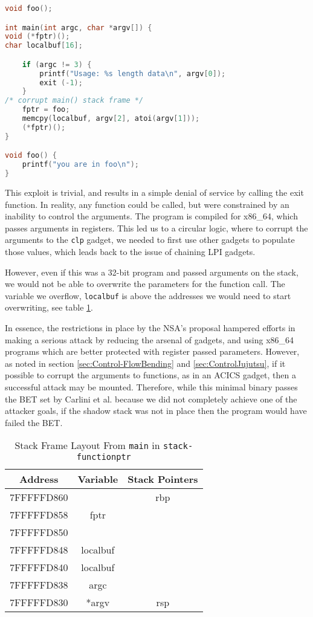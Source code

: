 \documentclass[conference,compsoc]{IEEEtran}
\begin{document}
\begin{lstlisting}[language=C,caption={Vulnerable C Program},label={lst:vulnProg}]
void foo();

int main(int argc, char *argv[]) {
void (*fptr)();
char localbuf[16];

	if (argc != 3) {
		printf("Usage: %s length data\n", argv[0]);
		exit (-1);
	}
/* corrupt main() stack frame */
	fptr = foo;
	memcpy(localbuf, argv[2], atoi(argv[1]));
	(*fptr)();
}

void foo() {
	printf("you are in foo\n");
}
\end{lstlisting}

This exploit is trivial, and results in a simple denial of service by calling the exit function. In reality, any function could be called, but were constrained by an inability to control the arguments. The program is compiled for x86\_64, which passes arguments in registers. This led us to a circular logic, where to corrupt the arguments to the \texttt{clp} gadget, we needed to first use other gadgets to populate those values, which leads back to the issue of chaining LPI gadgets.

However, even if this was a 32-bit program and passed arguments on the stack, we would not be able to overwrite the parameters for the function call. The variable we overflow, \texttt{localbuf} is above the addresses we would need to start overwriting, see table \ref{tbl:stackframe}.

In essence, the restrictions in place by the NSA's proposal hampered efforts in making a serious attack by reducing the arsenal of gadgets, and using x86\_64 programs which are better protected with register passed parameters. However, as noted in section \ref{sec:Control-FlowBending} and \ref{sec:ControlJujutsu}, if it possible to corrupt the arguments to functions, as in an ACICS gadget\cite{evans}, then a successful attack may be mounted. Therefore, while this minimal binary passes the BET set by Carlini et al. because we did not completely achieve one of the attacker goals, if the shadow stack was not in place then the program would have failed the BET.

\begin{table}[H]
\renewcommand{\arraystretch}{1.3}
\centering
\caption{Stack Frame Layout From  \texttt{main} in \texttt{stack-functionptr}}
\label{tbl:stackframe}
\begin{tabular}{|c c c|}
\hline
Address & Variable & Stack Pointers\\
\hline
7FFFFFD860 & \ & rbp\\
7FFFFFD858 & fptr &\ \\
7FFFFFD850 & \ &\ \\
7FFFFFD848 & localbuf &\ \\
7FFFFFD840 & localbuf &\ \\
7FFFFFD838 & argc &\ \\
7FFFFFD830 & *argv & rsp\\
\hline
\end{tabular}
\end{table}
\end{document}
